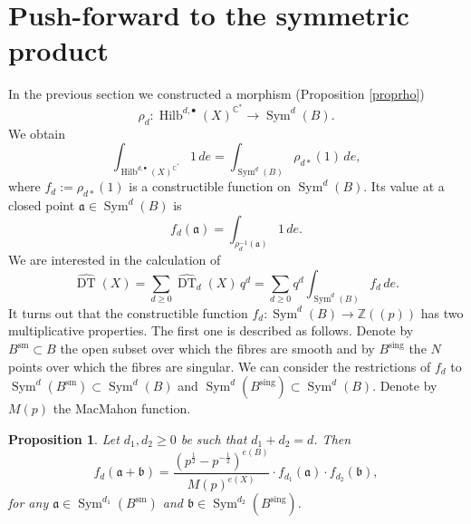 \documentclass{amsart}
\newtheorem{proposition}[theorem]{Proposition}
\theoremstyle{definition}
\newcommand{\CC} {\mathbb{C}}          %
\newcommand{\ZZ} {\mathbb{Z}}		%
\newcommand{\Sym}{\operatorname{Sym}}
\newcommand{\Hilb}{\operatorname{Hilb}}
\newcommand{\DT}{\operatorname{DT}}
\newcommand{\sm}{\operatorname{sm}}
\newcommand{\sing}{\operatorname{sing}}
\begin{document}


\section{Push-forward to the symmetric product} \label{sym}

In the previous section we constructed a morphism (Proposition \ref{proprho}) 
\begin{equation} \label{rho}
\rho_{d} : \Hilb^{d,\bullet}(X)^{\CC^*} \longrightarrow \Sym^d(B).
\end{equation}
We obtain
$$
\int_{\Hilb^{d,\bullet}(X)^{\CC^*}} 1 \, de = \int_{\Sym^d(B)} \rho_{d*}(1) \, de,
$$
where $f_d := \rho_{d*}(1)$ is a constructible function on $\Sym^d(B)$. Its value at a closed point $\mathfrak{a} \in \Sym^d(B)$ is 
$$
f_d(\mathfrak{a}) = \int_{\rho_{d}^{-1}(\mathfrak{a})} 1 \, de.
$$
We are interested in the calculation of
$$
\widehat{\DT}(X) = \sum_{d \geq 0} \widehat{\DT}_d(X) \, q^d =\sum_{d \geq 0} q^d \int_{\Sym^d(B)} f_d \, de.
$$
It turns out that the constructible function $f_d : \Sym^d(B) \rightarrow \ZZ(\!(p)\!)$ has two multiplicative properties. The first one is described as follows. Denote by $B^{\sm} \subset B$ the open subset over which the fibres are smooth and by $B^{\sing}$ the $N$ points over which the fibres are singular. We can consider the restrictions of $f_d$ to $\Sym^d(B^{\sm}) \subset \Sym^d(B)$ and $\Sym^d(B^{\sing}) \subset \Sym^d(B)$. Denote by $M(p)$ the MacMahon function.
\begin{proposition} \label{mult1}
Let $d_1, d_2 \geq 0$ be such that $d_1+d_2 = d$. Then 
$$ 
f_d(\mathfrak{a} + \mathfrak{b}) =\frac{(p^{\frac{1}{2}} - p^{-\frac{1}{2}})^{e(B)}}{M(p)^{e(X)}} \cdot f_{d_1}(\mathfrak{a}) \cdot f_{d_2}(\mathfrak{b}), 
$$
for any $\mathfrak{a} \in \Sym^{d_1}(B^{\sm})$ and $\mathfrak{b} \in \Sym^{d_2}(B^{\sing})$. 
\end{proposition}
\end{document}
